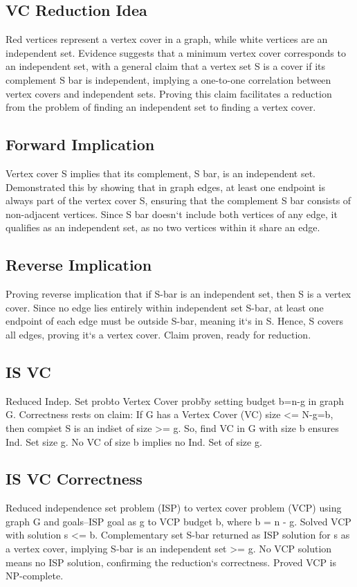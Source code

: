 \subsection*{VC  Reduction Idea}
Red vertices represent a vertex cover in a graph, while white vertices are an independent set.
Evidence suggests that a minimum vertex cover corresponds to an independent set, with a general claim that a vertex set S is a cover if its complement S bar is independent, implying a one-to-one correlation between vertex covers and independent sets.
Proving this claim facilitates a reduction from the problem of finding an independent set to finding a vertex cover.

\subsection*{Forward Implication}
Vertex cover S implies that its complement, S bar, is an independent set.
Demonstrated this by showing that in graph edges, at least one endpoint is always part of the vertex cover S, ensuring that the complement S bar consists of non-adjacent vertices.
Since S bar doesn`t include both vertices of any edge, it qualifies as an independent set, as no two vertices within it share an edge.

\subsection*{Reverse Implication}
Proving reverse implication that if S-bar is an independent set, then S is a vertex cover.
Since no edge lies entirely within independent set S-bar, at least one endpoint of each edge must be outside S-bar, meaning it`s in S\@.
Hence, S covers all edges, proving it`s a vertex cover.
Claim proven, ready for reduction.

\subsection*{IS VC}
Reduced Indep.
Set prob\. to Vertex Cover prob\. by setting budget b=n-g in graph G\@.
Correctness rests on claim: If G has a Vertex Cover (VC) size \textless{}= N-g=b, then comp\. set S is an ind\. set of size \textgreater{}= g.
So, find VC in G with size b ensures Ind.
Set size g.
No VC of size b implies no Ind.
Set of size g.

\subsection*{IS VC Correctness}
Reduced independence set problem (ISP) to vertex cover problem (VCP) using graph G and goals--ISP goal as g to VCP budget b, where b = n - g.
Solved VCP with solution s \textless{}= b.
Complementary set S-bar returned as ISP solution for s as a vertex cover, implying S-bar is an independent set \textgreater{}= g.
No VCP solution means no ISP solution, confirming the reduction`s correctness.
Proved VCP is NP-complete.

